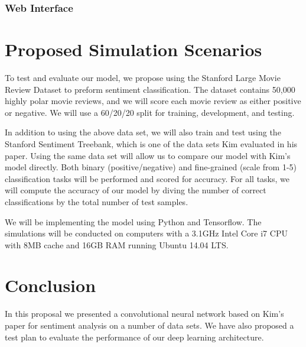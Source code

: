 \documentclass[conference]{IEEEtran}
\begin{document}
\subsubsection{Web Interface}
\label{model:stretch:web}

\section{Proposed Simulation Scenarios}
\label{scenarios}
    To test and evaluate our model, we propose using the Stanford Large Movie Review
    Dataset to preform sentiment classification\cite{maas2011learning}.
    The dataset contains 50,000 highly polar
    movie reviews, and we will score each movie review as either positive or
    negative. We will use a 60/20/20 split for training, development, and testing.

    In addition to using the above data set, we will also train and test using the Stanford Sentiment
    Treebank, which is one of the data sets Kim evaluated in his paper\cite{sentimenttreebank}.
    Using the same data set
    will allow us to compare our model with Kim's model directly. Both binary (positive/negative)
    and fine-grained (scale from 1-5) classification tasks will be performed and scored for accuracy.
    For all tasks, we will compute the accuracy of our model by diving the number of correct classifications
    by the total number of test samples.

    We will be implementing the model using Python and Tensorflow. The simulations will be conducted on
    computers with a 3.1GHz Intel Core i7 CPU with 8MB cache and 16GB RAM running Ubuntu 14.04 LTS.

\section{Conclusion}
\label{conclusions}
    In this proposal we presented a convolutional neural network based on 
    Kim's paper for sentiment analysis on a number of data sets. We have 
    also proposed a test plan to evaluate the performance of our deep 
    learning architecture.



\end{document}

